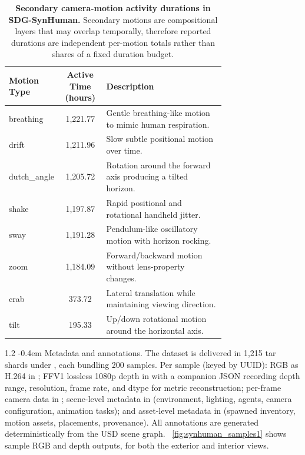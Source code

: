 \documentclass{llmxive}
\makeatletter
\providecommand{\paragraph}{  \@startsection{paragraph}{4}{\z@}    {1\baselineskip \@plus .2\baselineskip}    {-0.4em}    {\normalfont\normalsize\bfseries}}
\makeatother
\begin{document}
\begin{table}[t]
\centering
\captionsetup{justification=raggedright, singlelinecheck=false}
\small
\begin{tabular}{p{0.18\linewidth}cp{0.55\linewidth}}
\toprule
Motion Type & Active Time (hours) & Description \\
\midrule
breathing   & 1{,}221.77 & Gentle breathing-like motion to mimic human respiration. \\
drift       & 1{,}211.96 & Slow subtle positional motion over time. \\
dutch\_angle & 1{,}205.72 & Rotation around the forward axis producing a tilted horizon. \\
shake       & 1{,}197.87 & Rapid positional and rotational handheld jitter. \\
sway        & 1{,}191.28 & Pendulum-like oscillatory motion with horizon rocking. \\
zoom        & 1{,}184.09 & Forward/backward motion without lens-property changes. \\
crab        &   373.72   & Lateral translation while maintaining viewing direction. \\
tilt        &   195.33   & Up/down rotational motion around the horizontal axis. \\
\bottomrule
\end{tabular}
\caption{\textbf{Secondary camera-motion activity durations in SDG-SynHuman.} Secondary motions are compositional layers that may overlap temporally, therefore reported durations are independent per-motion totals rather than shares of a fixed duration budget.}
\label{tab:synhuman_secondary_motion}
\end{table}


\paragraph{Metadata and annotations.}
\label{appendix:sdg_synhuman_metadata_annotations}
The dataset is delivered in 1{,}215 tar shards under , each bundling 200 samples. Per sample (keyed by UUID): RGB as H.264 in ; FFV1 lossless 1080p depth in  with a companion JSON recording depth range, resolution, frame rate, and dtype for metric reconstruction; per-frame camera data in ; scene-level metadata in  (environment, lighting, agents, camera configuration, animation tasks); and asset-level metadata in  (spawned inventory, motion assets, placements, provenance). All annotations are generated deterministically from the USD scene graph. ~\cref{fig:synhuman_samples1} shows sample RGB and depth outputs, for both the exterior and interior views.
\end{document}
